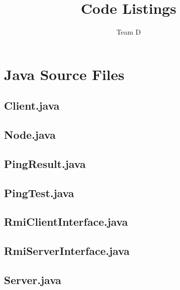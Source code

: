 \documentclass[a4wide,12pt]{article}
\title{Code Listings}
\author{Team D}
\begin{document}
\maketitle
\tableofcontents
\pagebreak
\section{Java Source Files}

\subsection{Client.java}



\subsection{Node.java}



\subsection{PingResult.java}



\subsection{PingTest.java}



\subsection{RmiClientInterface.java}



\subsection{RmiServerInterface.java}



\subsection{Server.java}


\end{document}
